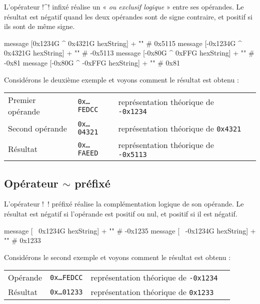 L'opérateur \ggs!^! infixé réalise un « \emph{ou exclusif logique} » entre ses opérandes. Le résultat est négatif quand les deux opérandes sont de signe contraire, et positif si ils sont de même signe.

\begin{galgas}
message [0x1234G ^ 0x4321G hexString] + "\n" # 0x5115
message [-0x1234G ^ 0x4321G hexString] + "\n" # -0x5113
message [-0x80G ^ 0xFFG hexString] + "\n" # -0x81
message [-0x80G ^ -0xFFG hexString] + "\n" # 0x81
\end{galgas}

Considérons le deuxième exemple et voyons comment le résultat est obtenu :

\begin{tabular}{llll}
Premier opérande & \texttt{0x…FEDCC} & représentation théorique de \texttt{-0x1234}\\
Second opérande  & \texttt{0x…04321} & représentation théorique de \texttt{0x4321} \\
Résultat & \texttt{0x…FAEED} & représentation théorique de \texttt{-0x5113} \\
\end{tabular}


\subsection{Opérateur $\sim$ préfixé}

L'opérateur \ggs!~! préfixé réalise la complémentation logique de son opérande. Le résultat est négatif si l'opérande est positif ou nul, et positif si il est négatif.

\begin{galgas}
message [~  0x1234G hexString] + "\n" # -0x1235
message [~ -0x1234G hexString] + "\n" # 0x1233
\end{galgas}

Considérons le second exemple et voyons comment le résultat est obtenu :

\begin{tabular}{llll}
Opérande & \texttt{0x…FEDCC} & représentation théorique de \texttt{-0x1234}\\
Résultat & \texttt{0x…01233} & représentation théorique de \texttt{0x1233} \\
\end{tabular}

